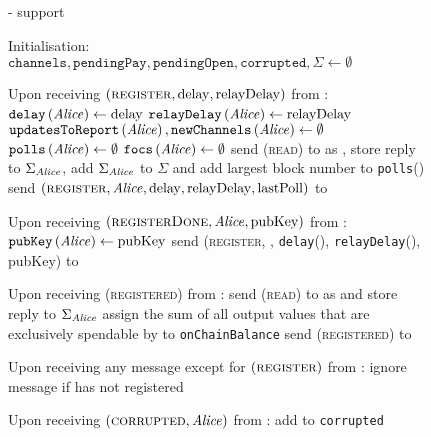   \begin{figure}[H]
    \begin{systembox}{\fpaynet - support}
      \begin{algorithmic}[1]
        \State Initialisation:
        \Indent
          \State $\mathtt{channels}, \mathtt{pendingPay}, \mathtt{pendingOpen},
          \mathtt{corrupted}, \Sigma \gets \emptyset$
        \EndIndent
        \Statex

        \State Upon receiving $\left(\textsc{register}, \mathrm{delay},
        \mathrm{relayDelay}\right)$ from \alice:
        \Indent
          \State $\mathtt{delay}\left(\mathit{Alice}\right) \gets \mathrm{delay}$
          \State $\mathtt{relayDelay}\left(\mathit{Alice}\right) \gets
          \mathrm{relayDelay}$
          \State $\mathtt{updatesToReport}\left(\mathit{Alice}\right),
          \mathtt{newChannels}\left(\mathit{Alice}\right) \gets \emptyset$
          \State $\mathtt{polls}\left(\mathit{Alice}\right) \gets \emptyset$
          \State $\mathtt{focs}\left(\mathit{Alice}\right) \gets \emptyset$
          \State send (\textsc{read}) to \ledger{} as \alice{}, store reply to
          $\Sigma_{\mathit{Alice}}$, add $\Sigma_{\mathit{Alice}}$ to $\Sigma$ and add largest
          block number to \texttt{polls}(\alice)
          \label{alg:fpaynet:support:lastpoll}
          \State send $\left(\textsc{register}, \mathit{Alice}, \mathrm{delay},
          \mathrm{relayDelay}, \mathrm{lastPoll}\right)$ to \simulator
        \EndIndent
        \Statex

        \State Upon receiving $\left(\textsc{registerDone}, \mathit{Alice},
        \mathrm{pubKey}\right)$ from \simulator:
        \Indent
          \State $\mathtt{pubKey}\left(\mathit{Alice}\right) \gets \mathrm{pubKey}$
          \State send (\textsc{register}, \alice, \texttt{delay}(\alice),
          \texttt{relayDelay}(\alice), pubKey) to \alice
        \EndIndent
        \Statex

        \State Upon receiving (\textsc{registered}) from \alice:
        \Indent
          \State send (\textsc{read}) to \ledger{} as \alice{} and store reply
          to $\Sigma_{\mathit{Alice}}$
          \State assign the sum of all output values that are exclusively
          spendable by \alice{} to \texttt{onChainBalance}
          \State send (\textsc{registered}) to \alice
        \EndIndent
        \Statex

        \State Upon receiving any message except for
        $\left(\textsc{register}\right)$ from \alice:
        \Indent
          \State ignore message if \alice{} has not registered
        \EndIndent
        \Statex

        \State Upon receiving $\left(\textsc{corrupted}, \mathit{Alice}\right)$ from
        \simulator:
        \Indent
          \State add \alice{} to \texttt{corrupted}
        \EndIndent
      \end{algorithmic}
    \end{systembox}
    \caption{}
    \label{alg:fpaynet:support}
  \end{figure}

